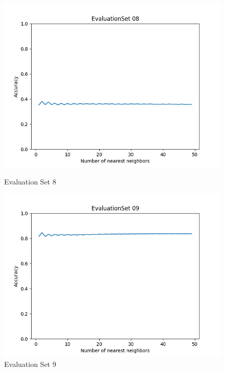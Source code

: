 \documentclass{article}
\begin{document}
\begin{figure}[H]
	\centering
	\begin{minipage}{.33\textwidth}
			\centering
			\includegraphics[width=1\linewidth]{../KNN_EvaluationSet 08.png}
			\caption{Evaluation Set 8}
	\end{minipage}\hfill
        \centering
	\begin{minipage}{.33\textwidth}
			\centering
			\includegraphics[width=1\linewidth]{../KNN_EvaluationSet 09.png}
			\caption{Evaluation Set 9}
	\end{minipage}\hfill
        \centering
	\begin{minipage}{.33\textwidth}
			\centering

\end{minipage}
\end{figure}
\end{document}

